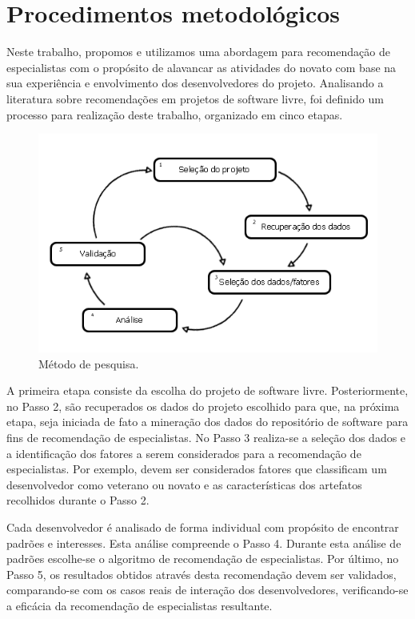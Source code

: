 \documentclass[oneside,brazil,a4paper]{normas-utf-tex}
\begin{document}
\chapter{Procedimentos metodológicos}
\label{cap:metodo}


Neste trabalho, propomos e utilizamos uma abordagem para recomendação de especialistas com o propósito de alavancar as atividades do novato com base na sua experiência e envolvimento dos desenvolvedores do projeto. Analisando a literatura sobre recomendações em projetos de software livre, foi definido um processo para realização deste trabalho, organizado em cinco etapas.

 \begin{figure}[hbt]
    \centering
    \includegraphics[width= .9\textwidth]{figuras/metodo_pesquisa}
    \caption{Método de pesquisa.}
    \label{fig:metodo}
 \end{figure}

A primeira etapa consiste da escolha do projeto de software livre. Posteriormente, no Passo 2, são recuperados os dados do projeto escolhido para que, na próxima etapa, seja iniciada de fato a mineração dos dados do repositório de software para fins de recomendação de especialistas.  No Passo 3 realiza-se a seleção dos dados e a identificação dos fatores a serem considerados para a recomendação de especialistas. Por exemplo, devem ser considerados fatores que classificam um desenvolvedor como veterano ou novato e as características dos artefatos recolhidos durante o Passo 2.

Cada desenvolvedor é analisado de forma individual com propósito de encontrar padrões e interesses. Esta análise compreende o Passo 4. Durante esta análise de padrões escolhe-se o algoritmo de recomendação de especialistas. Por último, no Passo 5, os resultados obtidos através desta recomendação devem ser validados, comparando-se com os casos reais de interação dos desenvolvedores, verificando-se a eficácia da recomendação de especialistas resultante.
\end{document}
